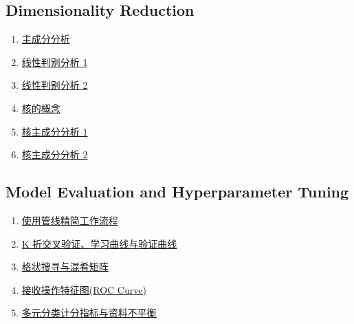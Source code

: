 \documentclass[11pt]{article}
\begin{document}
\subsection*{Dimensionality Reduction}

\vspace{-0.25cm}

\begin{multicols}{2}
	\begin{enumerate}
		\item \href{https://mp.weixin.qq.com/s/2-I5HxcBYDTYTNSBEd-z5w}{主成分分析}	%
		\item \href{https://mp.weixin.qq.com/s/EGDmY4r2QV_kDQDGnxVOcw}{线性判别分析 1}	%
		\item \href{https://mp.weixin.qq.com/s/CEz1I6dhVpvXD0A4XW_z1Q}{线性判别分析 2}	%
		\item \href{https://mp.weixin.qq.com/s/WufaoCxegQHAnpdIUY5A5g}{核的概念}	%
		\item \href{https://mp.weixin.qq.com/s/uo1jOcLzriNvIoymY7Y4oQ}{核主成分分析 1}	%
		\item \href{https://mp.weixin.qq.com/s/i-H-OMUGMhB8B4ARWJGVZQ}{核主成分分析 2}	%
	\end{enumerate}
\end{multicols}

\newpage 

\subsection*{Model Evaluation and Hyperparameter Tuning}

\vspace{-0.25cm}

\begin{multicols}{2}
	\begin{enumerate}
		\item \href{https://mp.weixin.qq.com/s/gkp9O7Jm9-q8-s9mgt7Mpg}{使用管线精简工作流程}	%
		\item \href{https://mp.weixin.qq.com/s/0zqlxs4ysakjCvheMMzkYA}{K 折交叉验证、学习曲线与验证曲线}	%
		\item \href{https://mp.weixin.qq.com/s/yOuSAAK91Uha4ip9Avw8xA}{格状搜寻与混肴矩阵}	%
		\item \href{https://mp.weixin.qq.com/s/sFnvZTjn1GjpIGge2XFSMw}{接收操作特征图(ROC Curve)}	%
		\item \href{https://mp.weixin.qq.com/s/-ljjb2d3K9hpOb9CcQPAVg}{多元分类计分指标与资料不平衡}	%
	\end{enumerate}
\end{multicols}
\end{document}
